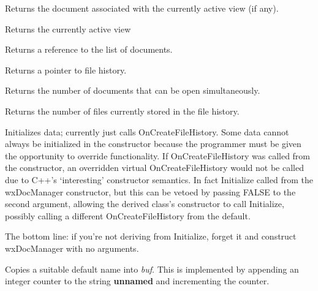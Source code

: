 Returns the document associated with the currently active view (if any).



Returns the currently active view 



Returns a reference to the list of documents.



Returns a pointer to file history.



Returns the number of documents that can be open simultaneously.



Returns the number of files currently stored in the file history.

\label{wxdocmanagerinitialize}


Initializes data; currently just calls OnCreateFileHistory. Some data cannot
always be initialized in the constructor because the programmer must be given
the opportunity to override functionality. If OnCreateFileHistory was called
from the constructor, an overridden virtual OnCreateFileHistory would not be
called due to C++'s `interesting' constructor semantics. In fact Initialize
 called from the wxDocManager constructor, but this can be
vetoed by passing FALSE to the second argument, allowing the derived class's
constructor to call Initialize, possibly calling a different OnCreateFileHistory
from the default.

The bottom line: if you're not deriving from Initialize, forget it and
construct wxDocManager with no arguments.



Copies a suitable default name into {\it buf}. This is implemented by
appending an integer counter to the string {\bf unnamed} and incrementing
the counter.

